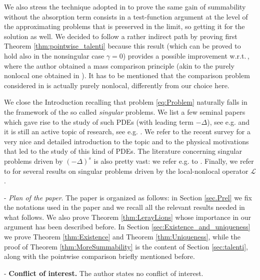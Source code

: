 \documentclass[11pt,a4paper]{amsart}
\theoremstyle{definition}
\theoremstyle{plain}
\numberwithin{equation}{section}
\begin{document}
We also stress the technique adopted in \cite{BO} to prove the same gain of summability without the absorption term consists in a test-function argument at the level of the approximating problems that is preserved in the limit, so getting it for the solution as well. We decided to follow a rather indirect path by proving first Theorem \ref{thm:pointwise_talenti} because this result (which can be proved to hold also in the nonsingular case $\gamma=0$) provides a possible improvement w.r.t.\,\cite{bahrouni}, where the author obtained a mass comparison principle (akin to the purely nonlocal one obtained in \cite{FeVo}). It has to be mentioned that the comparison problem considered in \cite{bahrouni} is actually purely nonlocal, differently from our choice here.




\medskip

We close the Introduction recalling that problem \eqref{eq:Problem} naturally falls in the framework of the so called {\em singular} problems. We list a few seminal papers which gave rise to the study of such PDEs (with leading term $-\Delta$), see e.g. \cite{Fulks, Stuart, CRT, LazMck, LairShaker} and it is still an active topic of research, see e.g. \cite{BO, CaDe, CGS, CMSS, CMST, OP, OP2, Oliva}. We refer to the recent survey \cite{OP3} for a very nice and detailed introduction to the topic and to the physical motivations that led to the study of this kind of PDEs. The literature concerning singular problems driven by $(-\Delta)^s$ is also pretty vast: we refer e.g. to \cite{BdBMP, ArNgRa, HuNg}. Finally, we refer to \cite{AnGa, Garain, GarainUkhlov, BiagiVecchi, ArRa, BhGh, BiGa, GKK, Biroud} for several results on singular problems driven by the local-nonlocal operator $\mathcal{L}$. 
\medskip

\noindent -\,\,\emph{Plan of the paper}. The paper is organized as follows: in Section \ref{sec.Prel} we fix the notations used in the paper and we recall all the relevant results needed in what follows. We also prove Theorem \ref{thm:LerayLions} whose importance in our argument has been described before. In Section \ref{sec:Existence_and_uniqueness} we prove Theorem \ref{thm:Existence} and Theorem \ref{thm:Uniqueness}, while the proof of Theorem \ref{thm:MoreSummability} is the content of Section \ref{sec:talenti}, along with the pointwise comparison briefly mentioned before.
\bigskip

\noindent-\,\,\textbf{Conflict of interest.} The author states no conflict of interest.
\end{document}
